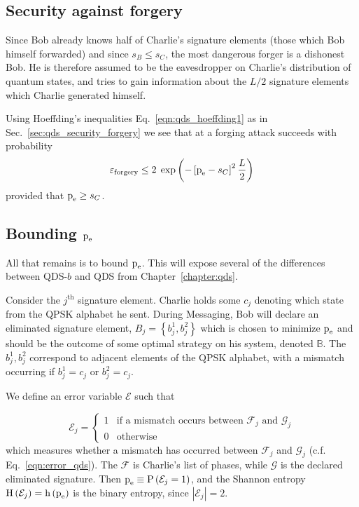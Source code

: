 \subsection{Security against forgery}
Since Bob already knows half of Charlie's signature elements (those which Bob himself forwarded) and since $s_B \le s_C$, the most dangerous forger is a dishonest Bob. He is therefore assumed to be the eavesdropper on Charlie's distribution of quantum states, and tries to gain information about the $L/2$ signature elements which Charlie generated himself.

Using Hoeffding's inequalities Eq.~\ref{eqn:qds_hoeffding1} as in Sec.~\ref{sec:qds_security_forgery} we see that at a forging attack succeeds with probability 
\begin{equation}\label{eqn:aqc_forgery}
\varepsilon_{\text{forgery}} \le 2 \; \exp\left( - \left[ \text{p}_{\text{e}} - s_C\right]^2 \frac{L}{2} \right)
\end{equation}
provided that $\text{p}_{\text{e}} \ge s_C$. 

\subsection{Bounding $\text{p}_{\text{e}}$}
All that remains is to bound $\text{p}_{\text{e}}$. This will expose several of the differences between QDS-$b$ and QDS from Chapter~\ref{chapter:qds}.


Consider the $j^\text{th}$ signature element. Charlie holds some $c_j$ denoting which state from the QPSK alphabet he sent. During Messaging, Bob will declare an eliminated signature element, $B_j = \left\{b_j^1, b_j^2\right\}$ which is chosen to minimize $\text{p}_{\text{e}}$ and should be the outcome of some optimal strategy on his system, denoted $\mathbb{B}$. The $b_j^1, b_j^2$ correspond to adjacent elements of the QPSK alphabet, with a mismatch occurring if $b_j^1 = c_j$ or $b_j^2 = c_j$. %

We define an error variable $\mathcal{E}$ such that 

\begin{equation*}\label{eqn:error}
\mathcal{E}_j = 
\begin{cases}
1 & \text{if a mismatch occurs between $\mathcal{F}_j$ and $\mathcal{G}_j$} \\
0 & \text{otherwise}
\end{cases}
\end{equation*}
which measures whether a mismatch has occurred between $\mathcal{F}_j$ and $\mathcal{G}_j$ (c.f. Eq.~\ref{eqn:error_qds}). The $\mathcal{F}$ is Charlie's list of phases, while $\mathcal{G}$ is the declared eliminated signature. Then $\text{p}_{\text{e}} \equiv \text{P}\left(\mathcal{E}_j = 1\right)$, and the Shannon entropy $\text{H}\left(\mathcal{E}_j\right) = \text{h}\left(\text{p}_{\text{e}}\right)$ is the binary entropy, since $\left|\mathcal{E}_j\right| = 2$. 

